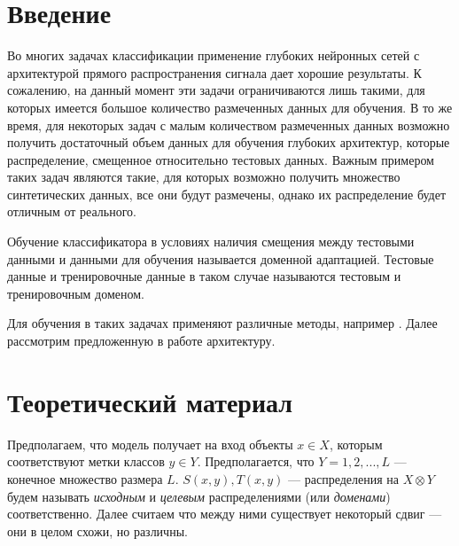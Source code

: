 \documentclass[14pt]{extarticle}
\begin{document}
\newpage

\tableofcontents

\newpage

\section*{Введение}

Во многих задачах классификации применение глубоких нейронных сетей с архитектурой прямого распространения сигнала дает хорошие результаты. К сожалению, на данный момент эти задачи ограничиваются лишь такими, для которых имеется большое количество размеченных данных для обучения. В то же время, для некоторых задач с малым количеством размеченных данных возможно получить достаточный объем данных для обучения глубоких архитектур, которые распределение, смещенное относительно тестовых данных.
Важным примером таких задач являются такие, для которых возможно получить множество синтетических данных, все они будут размечены, однако их распределение будет отличным от реального.

Обучение классификатора в условиях наличия смещения между тестовыми данными и данными для обучения называется доменной адаптацией. 
Тестовые данные и тренировочные данные в таком случае называются тестовым и тренировочным доменом. %

Для обучения в таких задачах применяют различные методы, например \cite{ganin}.  %
Далее рассмотрим предложенную в работе \cite{ganin} архитектуру. %

\newpage
\section{Теоретический материал}

Предполагаем, что модель получает на вход объекты $x \in X$, которым соответствуют метки классов $y \in Y$. Предполагается, что $Y = {1, 2, ..., L}$ — конечное множество размера $L$. $S(x,y), T(x,y)$ — распределения на $X \otimes Y$ будем называть \textit{исходным} и \textit{целевым} распределениями (или \textit{доменами}) соответственно. Далее считаем что между ними существует некоторый сдвиг — они в целом схожи, но различны.
\end{document}

